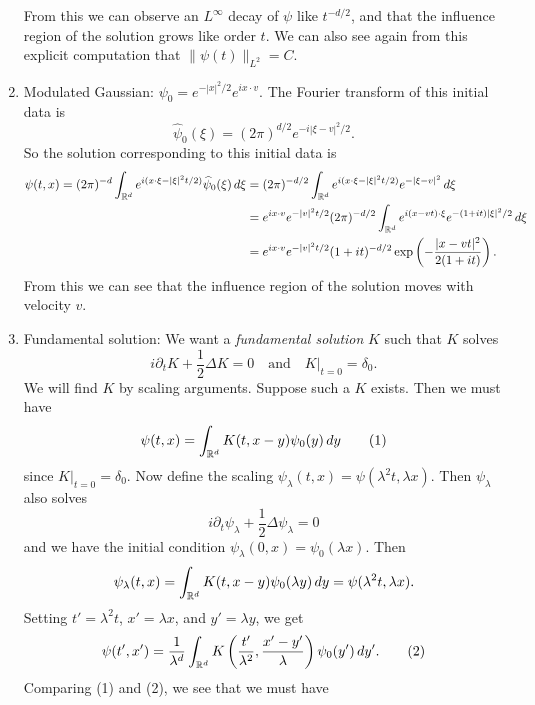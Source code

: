 \begin{example}
\begin{enumerate}
\[      \]
      From this we can observe an $L^\infty$ decay
      of $\psi$ like $t^{-d / 2}$, and that the influence
      region of the solution grows like order $t$.
      We can also see again from this explicit
      computation that $\|\psi(t)\|_{L^2} = C$.
    \item Modulated Gaussian: $\psi_0 = e^{-|x|^2 / 2} e^{ix \cdot v}$.
      The Fourier transform of this initial data is
      \[
        \widehat{\psi}_0(\xi)
        = (2\pi)^{d / 2} e^{-i|\xi - v|^2 / 2}.
      \]
      So the solution corresponding to this initial
      data is
      \begin{align*}
        \psi(t, x)
        = (2\pi)^{-d} \int_{\mathbb{R}^d} e^{i(x \cdot \xi - |\xi|^2 t / 2)} \widehat{\psi}_0(\xi) \, d\xi
        &= (2\pi)^{-d / 2} \int_{\mathbb{R}^d} e^{i(x \cdot \xi - |\xi|^2 t / 2)} e^{-|\xi - v|^2} \, d\xi \\
        &= e^{ix \cdot v} e^{-|v|^2 t / 2} (2\pi)^{-d / 2}
        \int_{\mathbb{R}^d} e^{i(x - vt) \cdot \xi} e^{-(1 + it) |\xi|^2 / 2}\, d\xi \\
        &= e^{ix \cdot v} e^{-|v|^2 t / 2}
        (1 + it)^{-d / 2}
        \exp\left(-\frac{|x - vt|^2}{2(1 + it)}\right).
      \end{align*}
      From this we can see that the influence region
      of the solution moves with velocity $v$.
    \item Fundamental solution: We want a
      \emph{fundamental solution} $K$ such that
      $K$ solves
      \[
        i \partial_t K + \frac{1}{2} \Delta K = 0
        \quad \text{and} \quad K|_{t = 0} = \delta_0.
      \]
      We will find $K$ by scaling arguments. Suppose
      such a $K$ exists. Then we must have
      \[
        \psi(t, x) = \int_{\mathbb{R}^d} K(t, x - y) \psi_0(y)\, dy \tag{1}
      \]
      since $K|_{t = 0} = \delta_0$.
      Now define the scaling
      $\psi_\lambda(t, x) = \psi(\lambda^2 t, \lambda x)$.
      Then $\psi_\lambda$ also solves
      \[
        i \partial_t \psi_\lambda + \frac{1}{2} \Delta \psi_\lambda = 0
      \]
      and we have the initial condition
      $\psi_\lambda(0, x) = \psi_0(\lambda x)$. Then
      \[
        \psi_\lambda(t, x)
        = \int_{\mathbb{R}^d} K(t, x - y)\psi_0(\lambda y)\, dy
        = \psi(\lambda^2 t, \lambda x).
      \]
      Setting $t' = \lambda^2 t$, $x' = \lambda x$, and
      $y' = \lambda y$, we get
      \[
        \psi(t', x')
        = \frac{1}{\lambda^d} \int_{\mathbb{R}^d} K\left(\frac{t'}{\lambda^2}, \frac{x' - y'}{\lambda}\right)
        \psi_0(y')\, dy'.
        \tag{2}
      \]
      Comparing (1) and (2), we see that we must have

\end{enumerate}
\end{example}

